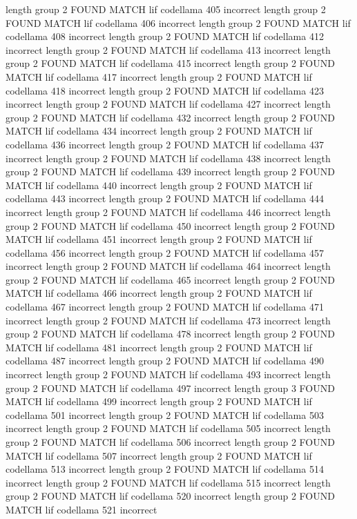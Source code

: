 length group  2
FOUND MATCH lif codellama 405 incorrect
length group  2
FOUND MATCH lif codellama 406 incorrect
length group  2
FOUND MATCH lif codellama 408 incorrect
length group  2
FOUND MATCH lif codellama 412 incorrect
length group  2
FOUND MATCH lif codellama 413 incorrect
length group  2
FOUND MATCH lif codellama 415 incorrect
length group  2
FOUND MATCH lif codellama 417 incorrect
length group  2
FOUND MATCH lif codellama 418 incorrect
length group  2
FOUND MATCH lif codellama 423 incorrect
length group  2
FOUND MATCH lif codellama 427 incorrect
length group  2
FOUND MATCH lif codellama 432 incorrect
length group  2
FOUND MATCH lif codellama 434 incorrect
length group  2
FOUND MATCH lif codellama 436 incorrect
length group  2
FOUND MATCH lif codellama 437 incorrect
length group  2
FOUND MATCH lif codellama 438 incorrect
length group  2
FOUND MATCH lif codellama 439 incorrect
length group  2
FOUND MATCH lif codellama 440 incorrect
length group  2
FOUND MATCH lif codellama 443 incorrect
length group  2
FOUND MATCH lif codellama 444 incorrect
length group  2
FOUND MATCH lif codellama 446 incorrect
length group  2
FOUND MATCH lif codellama 450 incorrect
length group  2
FOUND MATCH lif codellama 451 incorrect
length group  2
FOUND MATCH lif codellama 456 incorrect
length group  2
FOUND MATCH lif codellama 457 incorrect
length group  2
FOUND MATCH lif codellama 464 incorrect
length group  2
FOUND MATCH lif codellama 465 incorrect
length group  2
FOUND MATCH lif codellama 466 incorrect
length group  2
FOUND MATCH lif codellama 467 incorrect
length group  2
FOUND MATCH lif codellama 471 incorrect
length group  2
FOUND MATCH lif codellama 473 incorrect
length group  2
FOUND MATCH lif codellama 478 incorrect
length group  2
FOUND MATCH lif codellama 481 incorrect
length group  2
FOUND MATCH lif codellama 487 incorrect
length group  2
FOUND MATCH lif codellama 490 incorrect
length group  2
FOUND MATCH lif codellama 493 incorrect
length group  2
FOUND MATCH lif codellama 497 incorrect
length group  3
FOUND MATCH lif codellama 499 incorrect
length group  2
FOUND MATCH lif codellama 501 incorrect
length group  2
FOUND MATCH lif codellama 503 incorrect
length group  2
FOUND MATCH lif codellama 505 incorrect
length group  2
FOUND MATCH lif codellama 506 incorrect
length group  2
FOUND MATCH lif codellama 507 incorrect
length group  2
FOUND MATCH lif codellama 513 incorrect
length group  2
FOUND MATCH lif codellama 514 incorrect
length group  2
FOUND MATCH lif codellama 515 incorrect
length group  2
FOUND MATCH lif codellama 520 incorrect
length group  2
FOUND MATCH lif codellama 521 incorrect
